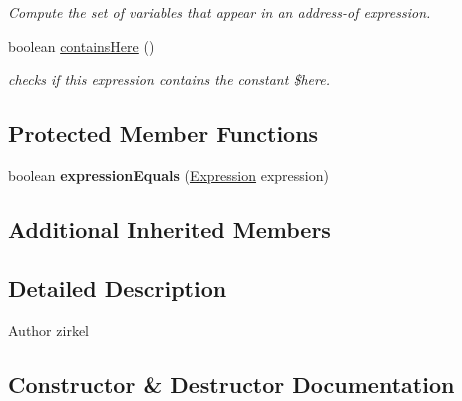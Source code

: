 \begin{DoxyCompactItemize}
\begin{DoxyCompactList}\small\item\em Compute the set of variables that appear in an address-\/of expression. \end{DoxyCompactList}\item 
boolean \hyperlink{classedu_1_1udel_1_1cis_1_1vsl_1_1civl_1_1model_1_1common_1_1expression_1_1CommonQuantifiedExpression_ab151b7524bf639ad5b6f1bb71e073e85}{contains\+Here} ()
\begin{DoxyCompactList}\small\item\em checks if this expression contains the constant \$here. \end{DoxyCompactList}\end{DoxyCompactItemize}
\subsection*{Protected Member Functions}
\begin{DoxyCompactItemize}
\item 
\hypertarget{classedu_1_1udel_1_1cis_1_1vsl_1_1civl_1_1model_1_1common_1_1expression_1_1CommonQuantifiedExpression_a0306a0147045833e41a86df01f447c6d}{}boolean {\bfseries expression\+Equals} (\hyperlink{interfaceedu_1_1udel_1_1cis_1_1vsl_1_1civl_1_1model_1_1IF_1_1expression_1_1Expression}{Expression} expression)\label{classedu_1_1udel_1_1cis_1_1vsl_1_1civl_1_1model_1_1common_1_1expression_1_1CommonQuantifiedExpression_a0306a0147045833e41a86df01f447c6d}

\end{DoxyCompactItemize}
\subsection*{Additional Inherited Members}


\subsection{Detailed Description}
\begin{DoxyAuthor}{Author}
zirkel 
\end{DoxyAuthor}


\subsection{Constructor \& Destructor Documentation}
\hypertarget{classedu_1_1udel_1_1cis_1_1vsl_1_1civl_1_1model_1_1common_1_1expression_1_1CommonQuantifiedExpression_ae351ec95e39c13fd5f20c4be03b6b8ac}{}
